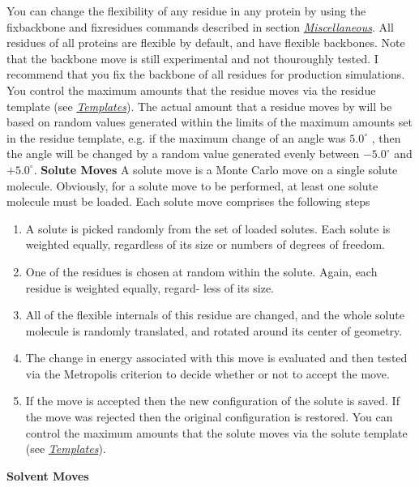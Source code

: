 \documentclass[letterpaper,10pt,english]{manual}
\begin{document}
You can change the flexibility of any residue in any protein by using the fixbackbone and fixresidues commands described in section \hyperlink{misccmd}{\emph{Miscellaneous}}. All residues of all proteins are flexible by default, and have flexible backbones. Note that the backbone move is still experimental and not thouroughly tested. I recommend that you fix the backbone of all residues for production simulations. You control the maximum amounts that the residue moves via the residue template (see \hyperlink{temref}{\emph{Templates}}). The actual amount that a residue moves by will be based on random values generated within the limits of the maximum amounts set in the residue template, e.g. if the maximum change of an angle was $5.0^\circ$ , then the angle will be changed by a random value generated evenly between $-5.0^\circ$ and $+5.0^\circ$.
\textbf{Solute Moves}
A solute move is a Monte Carlo move on a single solute molecule. Obviously, for a solute move to be performed, at least one solute molecule must be loaded. Each solute move comprises the following steps
\begin{enumerate}
\item {} 
A solute is picked randomly from the set of loaded solutes. Each solute is weighted equally, regardless of its size or numbers of degrees of freedom.

\item {} 
One of the residues is chosen at random within the solute. Again, each residue is weighted equally, regard- less of its size.

\item {} 
All of the flexible internals of this residue are changed, and the whole solute molecule is randomly translated, and rotated around its center of geometry.

\item {} 
The change in energy associated with this move is evaluated and then tested via the Metropolis criterion to decide whether or not to accept the move.

\item {} 
If the move is accepted then the new configuration of the solute is saved. If the move was rejected then the original configuration is restored. You can control the maximum amounts that the solute moves via the solute template (see \hyperlink{temref}{\emph{Templates}}).

\end{enumerate}
\textbf{Solvent Moves}
\end{document}

